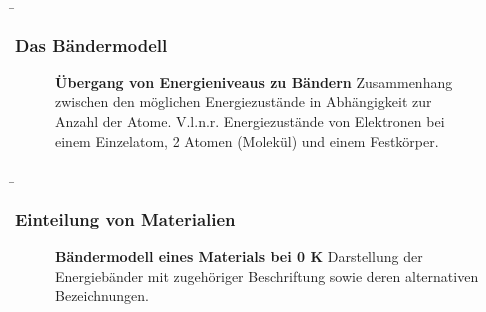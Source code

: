 \begin{frame}
{        %
}

\end{frame}

\begin{frame}
    \b{
    \frametitle{Das Bändermodell}
    \begin{figure}[H]
        \centering
        
        \caption{\textbf{Übergang von Energieniveaus zu Bändern} Zusammenhang zwischen den möglichen Energiezustände in Abhängigkeit zur Anzahl der Atome. V.l.n.r. Energiezustände von Elektronen bei einem Einzelatom, 2 Atomen (Molekül) und einem Festkörper.}  
    \end{figure}

    }
\end{frame}

\begin{frame}
    \b{
    \frametitle{Einteilung von Materialien}
    \begin{figure}[H]
        \centering
        
        \caption{\textbf{Bändermodell eines Materials bei 0 K} Darstellung der Energiebänder mit zugehöriger Beschriftung sowie deren alternativen Bezeichnungen.}  
    \end{figure}
    }

\end{frame}

